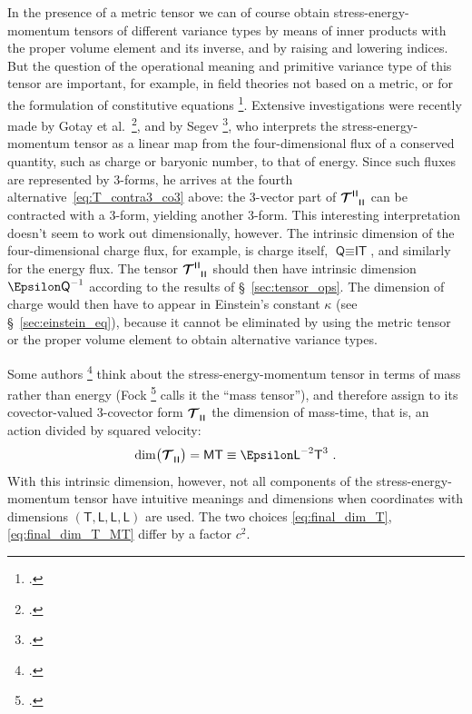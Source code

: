 \documentclass[\ifafour a4paper,12pt,\else a5paper,10pt,\fi%
onecolumn,oneside,article,%
british%
]{memoir}
\makeatletter
\theoremstyle{remark}
\theoremstyle{innote}
\newcommand*{\citep}{\footcites}
\renewcommand*{\|}[1][]{\nonscript\,#1\vert\nonscript\;\mathopen{}}
\newcommand*{\sect}{\S}%
\newcommand*{\chap}{ch.}%
\newcommand*{\eg}{{e.g.}}
\newcommand*{\cf}{{cf.}}
\newcommand*{\etal}{{et al.}}
\newcommand*{\q}{}%
\DeclareRobustCommand*{\q}{%
  \mathord{\mathpalette\bigcdot@{}}%
}
\newcommand*{\bigcdot@scalefactor}{0.7}
\newcommand*{\bigcdot@widthfactor}{1.5}
\newcommand*{\bigcdot@}[2]{%
  \sbox0{$#1\vcenter{}$}%
  \sbox2{$#1\cdot\m@th$}%
  \hbox to \bigcdot@widthfactor\wd2{%
    \hfil
    \raise\ht0\hbox{%
      \scalebox{\bigcdot@scalefactor}{%
        \lower\ht0\hbox{$#1\bullet\m@th$}%
      }%
    }%
    \hfil
  }%
}
\newcommand*{\Le}{\textsf{L}}
\newcommand*{\Ti}{\textsf{T}}
\newcommand*{\Ma}{\textsf{M}}
\newcommand*{\Cu}{\textsf{I}}
\newcommand*{\Ch}{\textsf{Q}}
\newcommand*{\En}{\Epsilon}%
\newcommand*{\yT}{\bm{\mathcal{T}}}
\renewcommand*{\i}{\indices}
\newcommand*{\yk}{\kappa}
\newcommand*{\rul}{{\mkern2mu\rule[-0.1ex]{0.75pt}{1.1ex}\mkern2mu}}
\DeclarePairedDelimiter\mul{\rul}{\rul}%
\makeatother
\begin{document}
In the presence of a metric tensor we can of course obtain
stress-energy-momentum tensors of different variance types by means of
inner products with the proper volume element and its inverse, and by
raising and lowering indices. But the question of the operational meaning
and primitive variance type of this tensor are important, for example, in
field theories not based on a metric, or for the formulation of
constitutive equations
\citep[\cf][\chap~G]{truesdelletal1960}{marsdenetal1983b_r1994,gotayetal1992}.
Extensive investigations were recently made by Gotay \etal\
\citep{gotayetal1998,gotayetal2004,gotayetal2006}, and by Segev
\citep{segev2002}[see also][]{segev2000b}, who interprets the
stress-energy-momentum tensor as a linear map from the four-dimensional
flux of a conserved quantity, such as charge or baryonic number, to that of
energy. Since such fluxes are represented by 3-forms, he arrives at the
fourth alternative~\eqref{eq:T_contra3_co3} above: the 3-vector part of
$\yT\i{^{\mul{\q\q\q}}_{\mul{\q\q\q}}}$ can be contracted with a 3-form,
yielding another 3-form. This interesting interpretation doesn't seem to
work out dimensionally, however. The intrinsic dimension of the
four-dimensional charge flux, for example, is charge itself,
$\Ch \equiv \Cu\Ti$, and similarly for the energy flux. The tensor
$\yT\i{^{\mul{\q\q\q}}_{\mul{\q\q\q}}}$ should then have intrinsic
dimension $\En\Ch^{-1}$ according to the results of
\sect~\ref{sec:tensor_ops}. The dimension of charge would then have to
appear in Einstein's constant $\yk$ (see \sect~\ref{sec:einstein_eq}),
because it cannot be eliminated by using the metric tensor or the proper
volume element to obtain alternative variance types.


\medskip

Some authors
\citep[\eg][\sect~V.55]{fock1955_t1964}[\sect~4.1]{mcvittie1956_r1965}[\sect~10.1]{adleretal1965_r1975}
think about the stress-energy-momentum tensor in terms of mass rather than
energy (Fock \citep[\sect~II.31]{fock1955_t1964} calls it the \enquote{mass
  tensor}), and therefore assign to its covector-valued 3-covector form
$\yT\i{_{\q \mul{\q\q\q}}}$ the dimension of mass-time, that is, an action
divided by squared velocity:
\begin{equation}
  \label{eq:final_dim_T_MT}
  \dim\bigl(\yT\i{_{\q \mul{\q\q\q}}}\bigr) = \Ma\Ti \equiv \En\Le^{-2}\Ti^{3} \ .
\end{equation}
With this intrinsic dimension, however, not all components of the
stress-energy-momentum tensor have intuitive meanings and dimensions when
coordinates with dimensions $(\Ti,\Le,\Le,\Le)$ are used. The two choices
\eqref{eq:final_dim_T}, \eqref{eq:final_dim_T_MT} differ by a factor
$c^{2}$.
\end{document}
